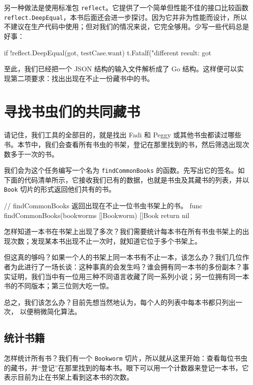 另一种做法是使用标准包 \texttt{reflect}。它提供了一个简单但性能不佳的接口比较函数 \texttt{reflect.DeepEqual}，本书后面还会进一步探讨。因为它并非为性能而设计，所以不建议在生产代码中使用；但对我们的情况来说，它完全够用。少写一些代码总是好事：

\begin{gocode}[]
if !reflect.DeepEqual(got, testCase.want) {
    t.Fatalf("different result: got %
}
\end{gocode}

至此，我们已经把一个 JSON 结构的输入文件解析成了 Go 结构。这样便可以实现第二项要求：找出出现在不止一份藏书中的书。

\section{寻找书虫们的共同藏书}

请记住，我们工具的全部目的，就是找出 Fadi 和 Peggy 或其他书虫都读过哪些书。本节中，我们会查看所有书虫的书架，登记在那里找到的书，然后筛选出现次数多于一次的书。

我们会为这个任务编写一个名为 \texttt{findCommonBooks} 的函数。先写出它的签名。如下面的代码清单所示，它接收我们已有的数据，也就是书虫及其藏书的列表，并以 \texttt{Book} 切片的形式返回他们共有的书。

\begin{gocode}[title={代码清单 3.11 \texttt{bookworm.go}：\texttt{findCommonBooks()} 的签名}]
// findCommonBooks 返回出现在不止一位书虫书架上的书。
func findCommonBooks(bookworms []Bookworm) []Book {
    return nil
}
\end{gocode}

怎样知道一本书在书架上出现了多次？我们需要统计每本书在所有书虫书架上的出现次数；发现某本书出现不止一次时，就知道它位于多个书架上。

但这真的够吗？如果一个人的书架上同一本书有不止一本，该怎么办？我们几位作者为此进行了一场长谈：这种事真的会发生吗？谁会拥有同一本书的多份副本？事实证明，我们当中有一位用三种不同语言收藏了同一系列小说；另一位拥有同一本书的不同版本；第三位则大吃一惊。

总之，我们该怎么办？目前先想当然地认为，每个人的列表中每本书都只列出一次，
以便稍微简化算法。

\subsection{统计书籍}

怎样统计所有书？我们有一个 \texttt{Bookworm} 切片，所以就从这里开始：查看每位书虫的藏书，并“登记”在那里找到的每本书。眼下可以用一个计数器来登记一本书，它表示目前为止在书架上看到这本书的次数。

